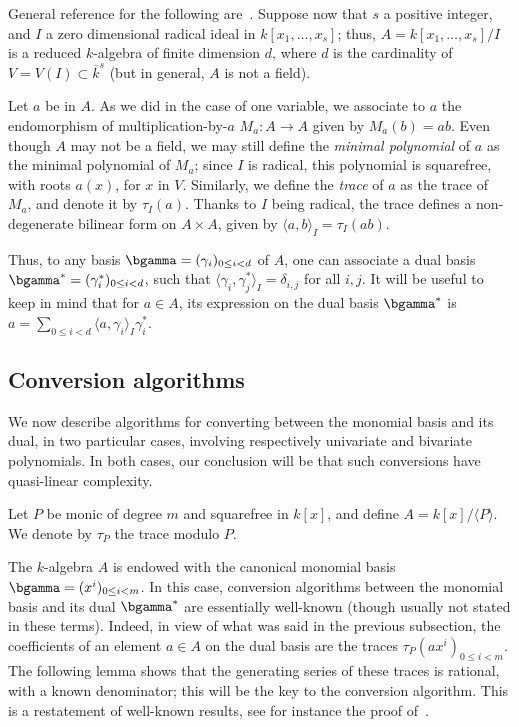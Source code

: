\documentclass{sig-alternate}
\newcounter{algo}
\newcommand{\ang}[1]{\langle#1\rangle}
\begin{document}
General reference for the following
are~\cite{Kunz86,Cox-Little-OShea:UAG2005}. Suppose now that $s$ a
positive integer, and $I$ a zero dimensional radical ideal in
$k[x_1,\dots,x_s]$; thus, $A=k[x_1,\dots,x_s]/I$ is a reduced
$k$-algebra of finite dimension $d$, where $d$ is the cardinality of
$V=V(I) \subset\overline{k}^s$ (but in general, $A$ is not a field).

Let $a$ be in $A$. As we did in the case of one variable, we associate
to $a$ the endomorphism of multiplication-by-$a$ $M_a: A \to A$ given
by $M_a(b)=ab$.  Even though $A$ may not be a field, we may still
define the {\em minimal polynomial} of $a$ as the minimal polynomial
of $M_a$; since $I$ is radical, this polynomial is squarefree, with
roots $a(x)$, for $x$ in $V$. Similarly, we define the \emph{trace} of
$a$ as the trace of $M_a$, and denote it by $\tau_I(a)$. Thanks to $I$
being radical, the trace defines a non-degenerate bilinear form on
$A\times A$, given by $\ang{a,b}_I = \tau_I(ab)$.

Thus, to any basis $\bgamma=(\gamma_i)_{0 \le i < d}$ of $A$, one can
associate a dual basis $\bgamma^\ast=(\gamma^\ast_i)_{0 \le i < d}$,
such that $\ang{\gamma_i, \gamma^\ast_j}_I=\delta_{i,j}$ for all
$i,j$.  It will be useful to keep in mind that for $a \in A$, its
expression on the dual basis $\bgamma^\ast$ is $a=\sum_{0 \le i < d}
\ang{a,\gamma_i}_I \gamma^\ast_i$.



\subsection{Conversion algorithms} \label{ssec:conversions}
\label{sec:trace-formulas}

We now describe algorithms for converting between the monomial basis and its
dual, in two particular cases, involving respectively univariate
and bivariate polynomials. In both cases, our conclusion will be that
such conversions have quasi-linear complexity.

\smallskip{} 
Let $P$ be monic of degree $m$ and squarefree in $k[x]$, and define
$A=k[x]/\ang{P}$. We denote by $\tau_P$ the trace modulo $P$.

The $k$-algebra $A$ is endowed with the canonical monomial basis
$\bgamma=(x^i)_{0 \le i < m}$.  In this case, conversion algorithms
between the monomial basis and its dual $\bgamma^\ast$ are essentially
well-known (though usually not stated in these terms). Indeed, in view
of what was said in the previous subsection, the coefficients of an
element $a \in A$ on the dual basis are the traces $\tau_P(ax^i)_{0
  \le i < m}$.  The following lemma shows that the generating series
of these traces is rational, with a known denominator; this will be
the key to the conversion algorithm. This is a restatement of
well-known results, see for instance the proof
of~\cite[Theorem~3.1]{rouiller99}.
\end{document}
